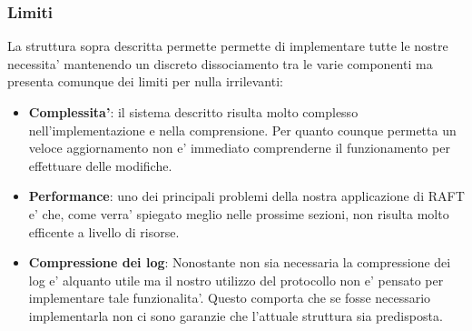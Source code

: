 \subsubsection{Limiti}
La struttura sopra descritta permette permette di implementare tutte le nostre necessita' 
mantenendo un discreto dissociamento tra le varie componenti ma presenta comunque dei limiti
per nulla irrilevanti:
\begin{itemize}
    \item \textbf{Complessita'}: il sistema descritto risulta molto complesso nell'implementazione 
        e nella comprensione. Per quanto counque permetta un veloce aggiornamento non e' 
        immediato comprenderne il funzionamento per effettuare delle modifiche.
    \item \textbf{Performance}: uno dei principali problemi della nostra applicazione di RAFT 
        e' che, come verra' spiegato meglio nelle prossime sezioni, non risulta molto efficente
        a livello di risorse. 
    \item \textbf{Compressione dei log}: Nonostante non sia necessaria la compressione dei log
        e' alquanto utile ma il nostro utilizzo del protocollo non e' pensato per implementare
        tale funzionalita'. Questo comporta che se fosse necessario implementarla
        non ci sono garanzie che l'attuale struttura sia predisposta.
\end{itemize}



